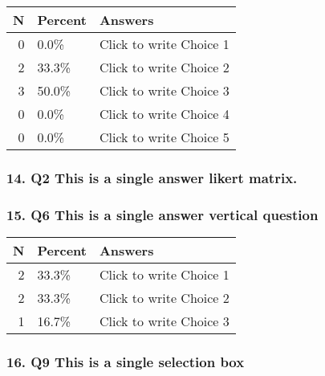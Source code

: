 \documentclass{article}\usepackage[]{graphicx}\usepackage[]{color}
\begin{document}
\begin{tabular}{r|l|l}
\hline
N & Percent & Answers\\
\hline
0 & 0.0\% & Click to write Choice 1\\
\hline
2 & 33.3\% & Click to write Choice 2\\
\hline
3 & 50.0\% & Click to write Choice 3\\
\hline
0 & 0.0\% & Click to write Choice 4\\
\hline
0 & 0.0\% & Click to write Choice 5\\
\hline
\end{tabular}


\hfill \break \hfill \break
\subsubsection*{14. Q2
This is a single answer likert matrix.}

\hfill \break \hfill \break
\subsubsection*{15. Q6
This is a single answer vertical question}

\begin{tabular}{r|l|l}
\hline
N & Percent & Answers\\
\hline
2 & 33.3\% & Click to write Choice 1\\
\hline
2 & 33.3\% & Click to write Choice 2\\
\hline
1 & 16.7\% & Click to write Choice 3\\
\hline
\end{tabular}


\hfill \break \hfill \break
\subsubsection*{16. Q9
This is a single selection box}

\hfill \break \hfill \break
\end{document}
